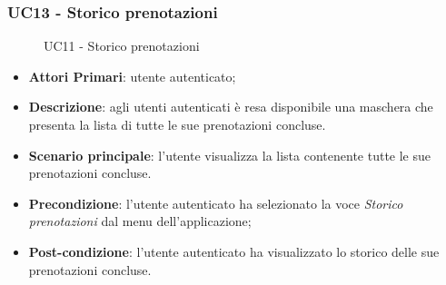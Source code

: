 \subsubsection{UC13 - Storico prenotazioni}
 \begin{figure}[h]
	\centering
	\caption{UC11 - Storico prenotazioni}
\end{figure}
\begin{itemize}
	\item \textbf{Attori Primari}: utente autenticato;
	\item \textbf{Descrizione}: agli utenti autenticati è resa disponibile una maschera che presenta la lista di tutte le sue prenotazioni concluse. 
	\item \textbf{Scenario principale}: l'utente visualizza la lista contenente tutte le sue prenotazioni concluse.
	\item \textbf{Precondizione}: l'utente autenticato ha selezionato la voce \textit{Storico prenotazioni} dal menu dell'applicazione;
	\item \textbf{Post-condizione}: l'utente autenticato ha visualizzato lo storico delle sue prenotazioni concluse. 
\end{itemize} 
